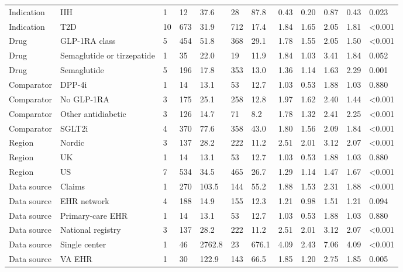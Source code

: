 \documentclass[journal]{IEEEtran}
\begin{document}
\begin{table}[!htbp]
{\begin{tabular}{llllllllllll}
Indication & IIH & 1 & 12 & 37.6 & 28 & 87.8 & 0.43 & 0.20 & 0.87 & 0.43 & 0.023 \\
Indication & T2D & 10 & 673 & 31.9 & 712 & 17.4 & 1.84 & 1.65 & 2.05 & 1.81 & \textless0.001 \\
Drug & GLP-1RA class & 5 & 454 & 51.8 & 368 & 29.1 & 1.78 & 1.55 & 2.05 & 1.50 & \textless0.001 \\
Drug & Semaglutide or tirzepatide & 1 & 35 & 22.0 & 19 & 11.9 & 1.84 & 1.03 & 3.41 & 1.84 & 0.052 \\
Drug & Semaglutide & 5 & 196 & 17.8 & 353 & 13.0 & 1.36 & 1.14 & 1.63 & 2.29 & 0.001 \\
Comparator & DPP-4i & 1 & 14 & 13.1 & 53 & 12.7 & 1.03 & 0.53 & 1.88 & 1.03 & 0.880 \\
Comparator & No GLP-1RA & 3 & 175 & 25.1 & 258 & 12.8 & 1.97 & 1.62 & 2.40 & 1.44 & \textless0.001 \\
Comparator & Other antidiabetic & 3 & 126 & 14.7 & 71 & 8.2 & 1.78 & 1.32 & 2.41 & 2.25 & \textless0.001 \\
Comparator & SGLT2i & 4 & 370 & 77.6 & 358 & 43.0 & 1.80 & 1.56 & 2.09 & 1.84 & \textless0.001 \\
Region & Nordic & 3 & 137 & 28.2 & 222 & 11.2 & 2.51 & 2.01 & 3.12 & 2.07 & \textless0.001 \\
Region & UK & 1 & 14 & 13.1 & 53 & 12.7 & 1.03 & 0.53 & 1.88 & 1.03 & 0.880 \\
Region & US & 7 & 534 & 34.5 & 465 & 26.7 & 1.29 & 1.14 & 1.47 & 1.67 & \textless0.001 \\
Data source & Claims & 1 & 270 & 103.5 & 144 & 55.2 & 1.88 & 1.53 & 2.31 & 1.88 & \textless0.001 \\
Data source & EHR network & 4 & 188 & 14.9 & 155 & 12.3 & 1.21 & 0.98 & 1.51 & 1.21 & 0.094 \\
Data source & Primary-care EHR & 1 & 14 & 13.1 & 53 & 12.7 & 1.03 & 0.53 & 1.88 & 1.03 & 0.880 \\
Data source & National registry & 3 & 137 & 28.2 & 222 & 11.2 & 2.51 & 2.01 & 3.12 & 2.07 & \textless0.001 \\
Data source & Single center & 1 & 46 & 2762.8 & 23 & 676.1 & 4.09 & 2.43 & 7.06 & 4.09 & \textless0.001 \\
Data source & VA EHR & 1 & 30 & 122.9 & 143 & 66.5 & 1.85 & 1.20 & 2.75 & 1.85 & 0.005 \\
\bottomrule\end{tabular}}
\end{table}
\end{document}
